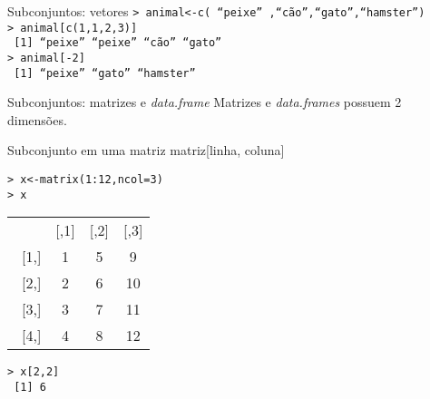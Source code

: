 \documentclass{beamer}
\begin{document}
\begin{frame}{Subconjuntos: vetores}
\texttt{> animal<-c( ``peixe'' ,``cão'',``gato'',``hamster'')\\}  
\pause
\texttt{> animal[c(1,1,2,3)]\\
~[1] ``peixe'' ``peixe'' ``cão''   ``gato'' \\ \pause
> animal[-2]\\
~[1] ``peixe''   ``gato''  ``hamster''\\
  }
\end{frame}

\begin{frame}{Subconjuntos: matrizes e \textit{data.frame}}
Matrizes e \textit{data.frames} possuem 2 dimensões.

\begin{block}{Subconjunto em uma matriz}
matriz[linha, coluna]  
\end{block}
\texttt{> x<-matrix(1:12,ncol=3)\\
> x}
\begin{table}[h]  
 \begin{tabular}{cccc} 
 & [,1] &[,2]&[,3] \\
~[1,]& 1& 5& 9 \\
~[2,] &   2 &   6 &  10\\
~[3,] &   3  &  7 &  11\\
~[4,] &   4  &  8 &  12\\
\end{tabular} 
\end{table} 

\texttt{> x[2,2]\\
~[1] 6}
\end{frame}

\end{document}
